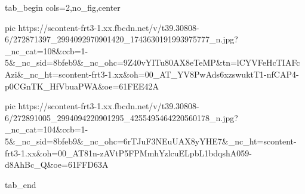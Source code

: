  
 
 
 
 


\ifcmt
  tab_begin cols=2,no_fig,center

     pic https://scontent-frt3-1.xx.fbcdn.net/v/t39.30808-6/272871397_2994092970901420_1743630191993975777_n.jpg?_nc_cat=108&ccb=1-5&_nc_sid=8bfeb9&_nc_ohc=9Z40vYITu80AX8eTeMP&tn=lCYVFeHcTIAFcAzi&_nc_ht=scontent-frt3-1.xx&oh=00_AT_YV8PwAds6xzswuktT1-nfCAP4-p0CGnTK_HfVbuaPWA&oe=61FEE42A

     pic https://scontent-frt3-1.xx.fbcdn.net/v/t39.30808-6/272891005_2994094220901295_4255495464220560178_n.jpg?_nc_cat=104&ccb=1-5&_nc_sid=8bfeb9&_nc_ohc=6rTJuF3NEuUAX8yYHE7&_nc_ht=scontent-frt3-1.xx&oh=00_AT81n-zAVtP5FPMmhYzlcuELpbL1bdqshA059-d8AhBc_Q&oe=61FFD63A

  tab_end
\fi
